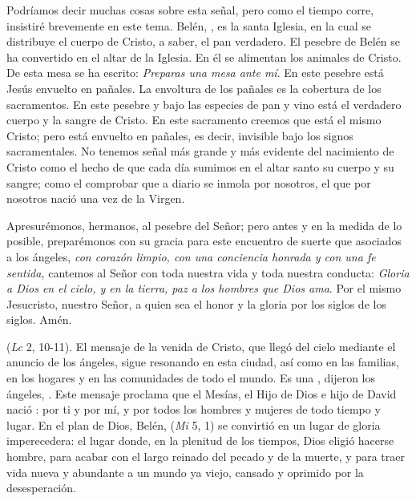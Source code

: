 \begin{body}
\begin{body}
Podríamos decir muchas cosas sobre esta señal, pero como el tiempo corre, insistiré brevemente en este tema. Belén, , es la santa Iglesia, en la cual se distribuye el cuerpo de Cristo, a saber, el pan verdadero. El pesebre de Belén se ha convertido en el altar de la Iglesia. En él se alimentan los animales de Cristo. De esta mesa se ha escrito: \emph{Preparas una mesa ante mí}. En este pesebre está Jesús envuelto en pañales. La envoltura de los pañales es la cobertura de los sacramentos. En este pesebre y bajo las especies de pan y vino está el verdadero cuerpo y la sangre de Cristo. En este sacramento creemos que está el mismo Cristo; pero está envuelto en pañales, es decir, invisible bajo los signos sacramentales. No tenemos señal más grande y más evidente del nacimiento de Cristo como el hecho de que cada día sumimos en el altar santo su cuerpo y su sangre; como el comprobar que a diario se inmola por nosotros, el que por nosotros nació una vez de la Virgen.

Apresurémonos, hermanos, al pesebre del Señor; pero antes y en la medida de lo posible, preparémonos con su gracia para este encuentro de suerte que asociados a los ángeles, \emph{con corazón limpio, con una conciencia honrada y con una fe sentida,} cantemos al Señor con toda nuestra vida y toda nuestra conducta: \emph{Gloria a Dios en el cielo, y en la tierra, paz a los hombres que Dios ama}. Por el mismo Jesucristo, nuestro Señor, a quien sea el honor y la gloria por los siglos de los siglos. Amén.

 (\emph{Lc} 2, 10-11). El mensaje de la venida de Cristo, que llegó del cielo mediante el anuncio de los ángeles, sigue resonando en esta ciudad, así como en las familias, en los hogares y en las comunidades de todo el mundo. Es una , dijeron los ángeles, . Este mensaje proclama que el Mesías, el Hijo de Dios e hijo de David nació : por ti y por mí, y por todos los hombres y mujeres de todo tiempo y lugar. En el plan de Dios, Belén,  (\emph{Mi} 5, 1) se convirtió en un lugar de gloria imperecedera: el lugar donde, en la plenitud de los tiempos, Dios eligió hacerse hombre, para acabar con el largo reinado del pecado y de la muerte, y para traer vida nueva y abundante a un mundo ya viejo, cansado y oprimido por la desesperación.


\end{body}
\end{body}
